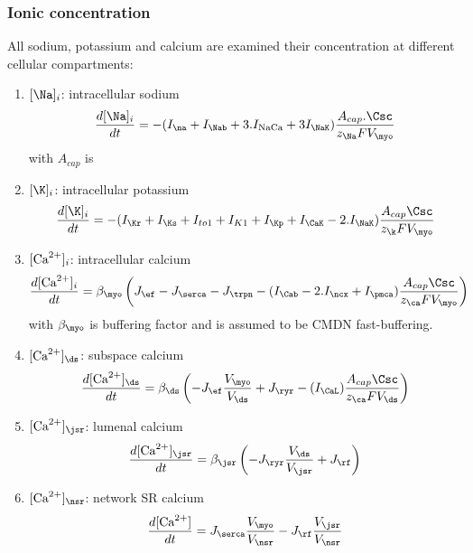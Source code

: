 \subsubsection{Ionic concentration}

All sodium, potassium and calcium are examined their concentration at
different cellular compartments:
\begin{enumerate}
\item $[\Na]_i$: intracellular sodium
  \begin{equation}
    \label{eq:1313}
    \frac{d[\Na]_i}{dt} = -(I_\na + I_\Nab + 3.I_\NaCa + 3
    I_\NaK)\frac{A_{cap}.\Csc}{z_\Na F V_\myo }
  \end{equation}
with $A_{cap}$ is

\item $[\K]_i$: intracellular potassium
  \begin{equation}
    \label{eq:1314}
    \frac{d[\K]_i}{dt} = - (I_\Kr + I_\Ks + I_{to1} + I_{K1} + I_\Kp +
    I_\CaK- 2. I_\NaK)\frac{A_{cap}\Csc}{z_\k F V_\myo}
  \end{equation}

\item $[{\text{Ca}^{2+}}]_i$: intracellular calcium
  \begin{equation}
    \label{eq:1315}
    \frac{d[\Ca]_i}{dt} = \beta_\myo \left( J_\ef - J_\serca - J_\trpn
    - (I_\Cab - 2.I_\ncx + I_\pmca ) 
    \frac{A_{cap}\Csc}{z_\ca F V_\myo} \right)
  \end{equation}
with $\beta_\myo$ is buffering factor and is assumed to be CMDN
fast-buffering. 

\item $[\Ca]_\ds$: subspace calcium
  \begin{equation}
    \label{eq:1316}
    \frac{d[\Ca]_\ds}{dt} = \beta_\ds \left( -J_\ef\frac{V_\myo}{V_\ds} 
      + J_\ryr - (I_\CaL ) 
      \frac{A_{cap}\Csc}{z_\ca F V_\ds} \right)
  \end{equation}

\item $[\Ca]_\jsr$: lumenal calcium
  \begin{equation}
    \label{eq:1317}
    \frac{d[\Ca]_\jsr}{dt} = \beta_\jsr \left( -J_\ryr
      \frac{V_\ds}{V_\jsr}
+ J_\rf \right)
  \end{equation}

\item $[\Ca]_\nsr$: network SR calcium
  \begin{equation}
    \label{eq:1318}
    \frac{d[\Ca]}{dt} = J_\serca \frac{V_\myo}{V_\nsr}-J_\rf\frac{V_\jsr}{V_\nsr}
  \end{equation}

\end{enumerate}



